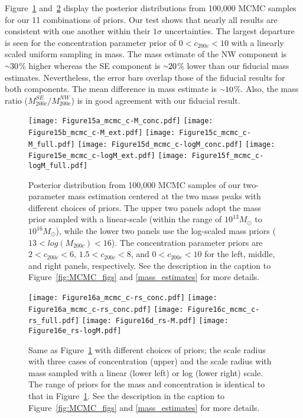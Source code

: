 \documentclass[twocolumn]{aastex631}
\newcommand{\mytilde}{\raise.19ex\hbox{$\scriptstyle\sim$}}
\begin{document}
Figure~\ref{fig:ap1} and~\ref{fig:ap2} display the posterior distributions from 100,000 MCMC samples for our 11 combinations of priors. 
Our test shows that nearly all results are consistent with one another within their $1\sigma$ uncertainties. 
The largest departure is seen for the concentration parameter prior of $ 0 < c_{200c} < 10$ with a linearly scaled uniform sampling in mass. The mass estimate of the NW component is $\mytilde30$\% higher whereas the SE component is $\mytilde20$\% lower than our fiducial mass estimates. 
Nevertheless, the error bars overlap those of the fiducial results for both components. The mean difference in mass estimate is $\mytilde10$\%. Also, the mass ratio ($M^{SE}_{200c}/M^{NW}_{200c}$) is in good agreement with our fiducial result. 



\begin{figure}
\centering
\texttt{[image: Figure15a\_mcmc\_c-M\_conc.pdf]}
\texttt{[image: Figure15b\_mcmc\_c-M\_ext.pdf]}
\texttt{[image: Figure15c\_mcmc\_c-M\_full.pdf]}
\texttt{[image: Figure15d\_mcmc\_c-logM\_conc.pdf]}
\texttt{[image: Figure15e\_mcmc\_c-logM\_ext.pdf]}
\texttt{[image: Figure15f\_mcmc\_c-logM\_full.pdf]}
\caption{Posterior distribution from 100,000 MCMC samples of our two-parameter mass estimation centered at the two mass peaks with different choices of priors. 
The upper two panels adopt the mass prior sampled with a linear-scale (within the range of $10^{13} M_{\odot}$ to $10^{16} M_{\odot}$), while the lower two panels use the log-scaled mass priors ($13 < log (M_{200c}) < 16$). 
The concentration parameter priors are $2 < c_{200c} < 6$, $1.5 < c_{200c} < 8$, and $0 < c_{200c} < 10$ for the left, middle, and right panels, respectively. 
See the description in the caption to Figure~\ref{fig:MCMC_figs} and \textsection\ref{mass_estimates} for more details. }
\label{fig:ap1}
\end{figure}


\begin{figure}
\centering
\texttt{[image: Figure16a\_mcmc\_c-rs\_conc.pdf]}
\texttt{[image: Figure16a\_mcmc\_c-rs\_conc.pdf]}
\texttt{[image: Figure16c\_mcmc\_c-rs\_full.pdf]}
\texttt{[image: Figure16d\_rs-M.pdf]}
\texttt{[image: Figure16e\_rs-logM.pdf]}
\caption{Same as Figure~\ref{fig:ap1} with different choices of priors; the scale radius with three cases of concentration (upper) and the scale radius with mass sampled with a linear (lower left) or log (lower right) scale. 
The range of priors for the mass and concentration is identical to that in Figure~\ref{fig:ap1}. 
See the description in the caption to Figure~\ref{fig:MCMC_figs} and \textsection\ref{mass_estimates} for more details. }
\label{fig:ap2}
\end{figure}
\end{document}
